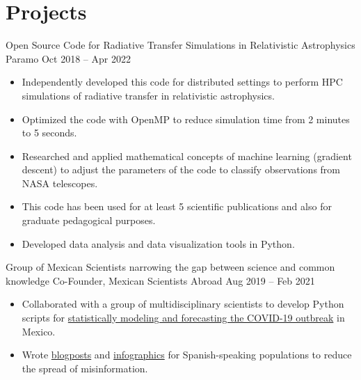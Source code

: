 \section{Projects}
%
{Open Source Code for Radiative Transfer Simulations in Relativistic Astrophysics}%
{Paramo}%
{Oct 2018 -- Apr 2022}%
{}%
{%
\begin{itemize}
    \item Independently developed this code for distributed settings to perform HPC simulations of radiative transfer in relativistic astrophysics.
    \item Optimized the code with OpenMP to reduce simulation time from 2 minutes to 5 seconds.
    \item Researched and applied mathematical concepts of machine learning (gradient descent) to adjust the parameters of the code to classify observations from NASA telescopes.
    \item This code has been used for at least 5 scientific publications and also for graduate pedagogical purposes.
    \item Developed data analysis and data visualization tools in Python.
\end{itemize}
}
%
{Group of Mexican Scientists narrowing the gap between science and common knowledge}%
{Co-Founder, Mexican Scientists Abroad}%
{Aug 2019 -- Feb 2021}%
{}%
{%
\begin{itemize}
    \item Collaborated with a group of multidisciplinary scientists to develop Python scripts for \href{https://mexiciencia.github.io/post/covid19/}{statistically modeling and forecasting the COVID-19 outbreak} in Mexico. 
    \item Wrote \href{https://mexiciencia.github.io/post/modelo-sir/}{blogposts} and \href{https://mexiciencia.github.io/post/anita/}{infographics} for Spanish-speaking populations to reduce the spread of misinformation.
\end{itemize}
}

